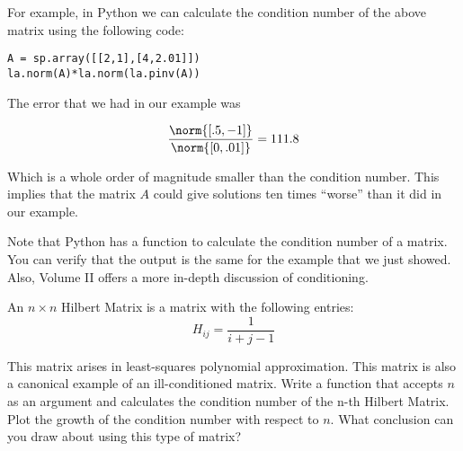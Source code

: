 For example, in Python we can calculate the condition number of the above matrix using the following code:


\begin{lstlisting}[style=python]
A = sp.array([[2,1],[4,2.01]])
la.norm(A)*la.norm(la.pinv(A))
\end{lstlisting}

The error that we had in our example was

\[
\frac{\norm{[.5, -1]}}{\norm{[0, .01]}} = 111.8
\]

Which is a whole order of magnitude smaller than the condition number. This implies that the matrix $A$ could give solutions ten times ``worse'' than it did in our example.

Note that Python has a  function to calculate the condition number of a matrix. You can verify that the output is the same for the example that we just showed. Also, Volume II offers a more in-depth discussion of conditioning.

\begin{problem}
An $n \times n$ Hilbert Matrix is a matrix with the following entries:
\[
H_{ij} = \frac{1}{i + j -1}
\]

This matrix arises in least-squares polynomial approximation. This matrix is also a canonical example of an ill-conditioned matrix. Write a function that accepts $n$ as an argument and calculates the condition number of the n-th Hilbert Matrix. Plot the growth of the condition number with respect to $n$. What conclusion can you draw about using this type of matrix? %
\end{problem}